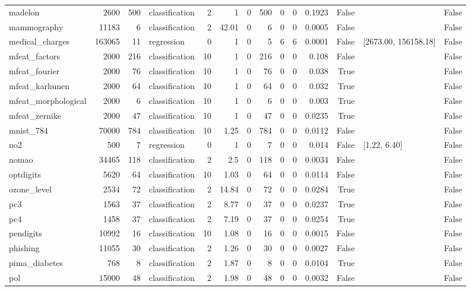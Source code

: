 \begin{table}
\begin{tabular}{lrrlrrrrrrrrlr}
madelon & 2600 & 500 & classification & 2 & 1 & 0 & 500 & 0 & 0 & 0.1923 & False &  & False \\
mammography & 11183 & 6 & classification & 2 & 42.01 & 0 & 6 & 0 & 0 & 0.0005 & False &  & False \\
medical\_charges & 163065 & 11 & regression & 0 & 1 & 0 & 5 & 6 & 6 & 0.0001 & False & [2673.00, 156158.18] & False \\
mfeat\_factors & 2000 & 216 & classification & 10 & 1 & 0 & 216 & 0 & 0 & 0.108 & False &  & False \\
mfeat\_fourier & 2000 & 76 & classification & 10 & 1 & 0 & 76 & 0 & 0 & 0.038 & True &  & False \\
mfeat\_karhunen & 2000 & 64 & classification & 10 & 1 & 0 & 64 & 0 & 0 & 0.032 & True &  & False \\
mfeat\_morphological & 2000 & 6 & classification & 10 & 1 & 0 & 6 & 0 & 0 & 0.003 & True &  & False \\
mfeat\_zernike & 2000 & 47 & classification & 10 & 1 & 0 & 47 & 0 & 0 & 0.0235 & True &  & False \\
mnist\_784 & 70000 & 784 & classification & 10 & 1.25 & 0 & 784 & 0 & 0 & 0.0112 & False &  & False \\
no2 & 500 & 7 & regression & 0 & 1 & 0 & 7 & 0 & 0 & 0.014 & False & [1.22, 6.40] & False \\
nomao & 34465 & 118 & classification & 2 & 2.5 & 0 & 118 & 0 & 0 & 0.0034 & False &  & False \\
optdigits & 5620 & 64 & classification & 10 & 1.03 & 0 & 64 & 0 & 0 & 0.0114 & False &  & False \\
ozone\_level & 2534 & 72 & classification & 2 & 14.84 & 0 & 72 & 0 & 0 & 0.0284 & True &  & False \\
pc3 & 1563 & 37 & classification & 2 & 8.77 & 0 & 37 & 0 & 0 & 0.0237 & True &  & False \\
pc4 & 1458 & 37 & classification & 2 & 7.19 & 0 & 37 & 0 & 0 & 0.0254 & True &  & False \\
pendigits & 10992 & 16 & classification & 10 & 1.08 & 0 & 16 & 0 & 0 & 0.0015 & False &  & False \\
phishing & 11055 & 30 & classification & 2 & 1.26 & 0 & 30 & 0 & 0 & 0.0027 & False &  & False \\
pima\_diabetes & 768 & 8 & classification & 2 & 1.87 & 0 & 8 & 0 & 0 & 0.0104 & True &  & False \\
pol & 15000 & 48 & classification & 2 & 1.98 & 0 & 48 & 0 & 0 & 0.0032 & False &  & False \\

\end{tabular}
\end{table}
